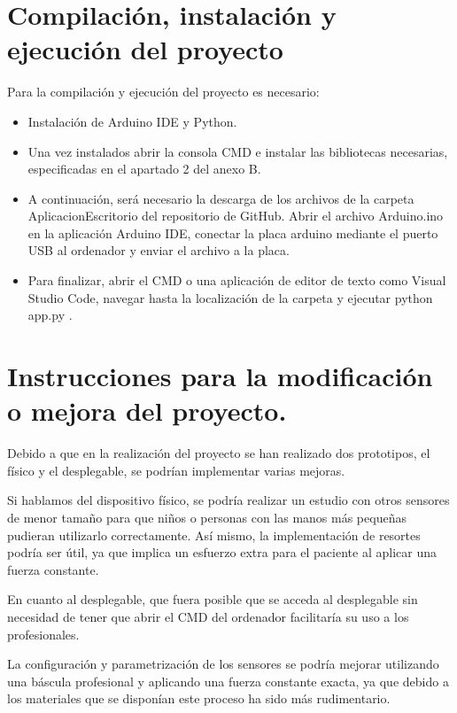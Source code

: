 \section{Compilación, instalación y ejecución del proyecto}
Para la compilación y ejecución del proyecto es necesario: 
\begin{itemize}
    \item Instalación de Arduino IDE y Python.
    \item Una vez instalados abrir la consola CMD e instalar las bibliotecas necesarias, especificadas en el apartado 2 del anexo B. 
    \item A continuación, será necesario la descarga de los archivos de la carpeta AplicacionEscritorio del repositorio de GitHub. Abrir el archivo Arduino.ino en la aplicación Arduino IDE, conectar la placa arduino mediante el puerto USB al ordenador y enviar el archivo a la placa. 
    \item Para finalizar, abrir el CMD o una aplicación de editor de texto como Visual Studio Code, navegar hasta la localización de la carpeta y ejecutar python app.py .
\end{itemize}

\section{Instrucciones para la modificación o mejora del proyecto.}

Debido a que en la realización del proyecto se han realizado dos prototipos, el físico y el desplegable, se podrían implementar varias mejoras.

Si hablamos del dispositivo físico, se podría realizar un estudio con otros sensores de menor tamaño para que niños o personas con las manos más pequeñas pudieran utilizarlo correctamente. Así mismo, la implementación de resortes podría ser útil, ya que implica un esfuerzo extra para el paciente al aplicar una fuerza constante. 

En cuanto al desplegable, que fuera posible que se acceda al desplegable sin necesidad de tener que abrir el CMD del ordenador facilitaría su uso a los profesionales.

La configuración y parametrización de los sensores se podría mejorar utilizando una báscula profesional y aplicando una fuerza constante exacta, ya que debido a los materiales que se disponían este proceso ha sido más rudimentario.